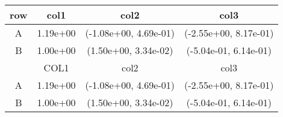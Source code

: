 \begin{tabular}{cccc}
\toprule
row&col1&col2&col3\tabularnewline
\midrule
A&1.19e+00& (-1.08e+00, 4.69e-01)& (-2.55e+00, 8.17e-01)\tabularnewline
B&1.00e+00& (1.50e+00, 3.34e-02)& (-5.04e-01, 6.14e-01)\tabularnewline
\midrule
&COL1&col2&col3\tabularnewline
\midrule
A&1.19e+00& (-1.08e+00, 4.69e-01)& (-2.55e+00, 8.17e-01)\tabularnewline
B&1.00e+00& (1.50e+00, 3.34e-02)& (-5.04e-01, 6.14e-01)\tabularnewline
\bottomrule
\end{tabular}
